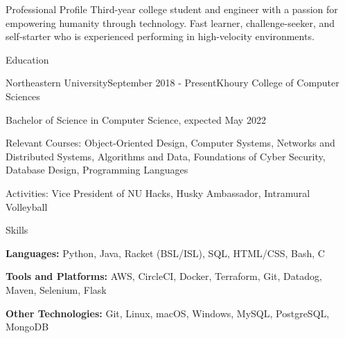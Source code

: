\documentclass{resume}
\begin{document}
\begin{rSection}{Professional Profile}
Third-year college student and engineer with a passion for empowering humanity through technology. 
Fast learner, challenge-seeker, and self-starter who is experienced performing in high-velocity environments.      
\end{rSection}


\begin{rSection}{Education}
\begin{rSubsection}{Northeastern University}{September 2018 - Present}{Khoury College of Computer Sciences}{}
\item Bachelor of Science in Computer Science, expected May 2022
\item Relevant Courses: Object-Oriented Design, Computer Systems, Networks and Distributed Systems,  Algorithms and Data, Foundations of Cyber Security, Database Design, Programming Languages
\item Activities: Vice President of NU Hacks, Husky Ambassador, Intramural Volleyball
\end{rSubsection}

\end{rSection}

\begin{rSection}{Skills}
  \begin{list}{\tiny\raisebox{1ex}{\textbullet}}{\leftmargin=2.0em}
    \item {\bf Languages:} Python, Java, Racket (BSL/ISL), SQL, HTML/CSS, Bash, C
    \item {\bf Tools and Platforms:} AWS, CircleCI, Docker, Terraform, Git, Datadog, Maven, Selenium,
    Flask
    \item {\bf Other Technologies:} Git, Linux, macOS, Windows, MySQL, PostgreSQL, MongoDB
  \end{list}
\end{rSection}
\end{document}
